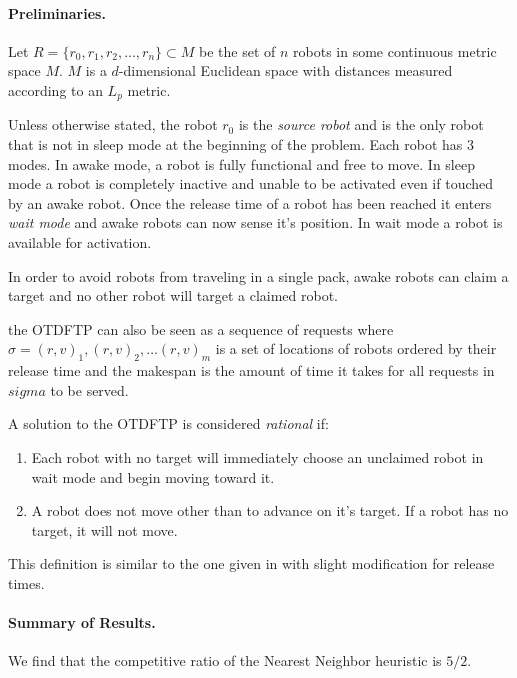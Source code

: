 \documentclass[twoside]{article}
\begin{document}
\begin{multicols}{2}
\paragraph{Preliminaries.}
Let $R = \{r_0, r_1, r_2, \dots , r_n \} \subset M$ be the set of $n$ robots in some continuous metric space $M$. $M$ is a $d$-dimensional Euclidean space with distances measured according to an $L_p$ metric.

Unless otherwise stated, the robot $r_0$ is the \textit{source robot} and is the only robot that is not in sleep mode at the beginning of the problem. Each robot has 3 modes. In awake mode, a robot is fully functional and free to move. In sleep mode a robot is completely inactive and unable to be activated even if touched by an awake robot. Once the release time of a robot has been reached it enters \textit{wait mode} and awake robots can now sense it's position. In wait mode a robot is available for activation.

In order to avoid robots from traveling in a single pack, awake robots can claim a target and no other robot will target a claimed robot. \cite{FTP.2}

the OTDFTP can also be seen as a sequence of requests where $\sigma = (r, v)_1, (r, v)_2, \dots (r, v)_m$ is a set of locations of robots ordered by their release time and the makespan is the amount of time it takes for all requests in $sigma$ to be served.

A solution to the OTDFTP is considered \textit{rational} if:
\begin{enumerate}
	\item Each robot with no target will immediately choose an unclaimed robot in wait mode and begin moving toward it.
	\item A robot does not move other than to advance on it's target. If a robot has no target, it will not move.
\end{enumerate}
This definition is similar to the one given in \cite{FTP.0} with slight modification for release times.
\paragraph{Summary of Results.}
We find that the competitive ratio of the Nearest Neighbor heuristic is $5/2$.


\end{multicols}
\end{document}

